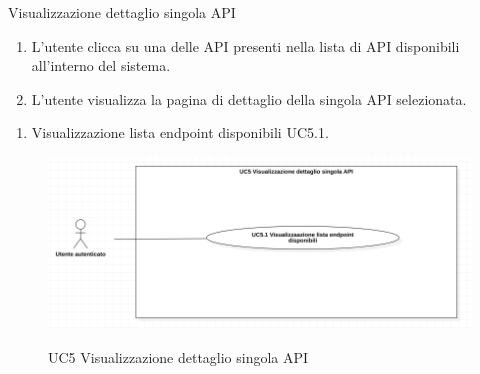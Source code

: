 \begin{usecase}{5}{Visualizzazione dettaglio singola API}\label{uc:visualizzazione-dettaglio-singola-api}

    \usecasemain{}
        \begin{enumerate}
            \item L'utente clicca su una delle API presenti nella lista di API disponibili all'interno del sistema.
            \item L'utente visualizza la pagina di dettaglio della singola API selezionata.
        \end{enumerate}

    \usecasegen{}
        \begin{enumerate}
            \item Visualizzazione lista endpoint disponibili UC5.1.
        \end{enumerate}

\end{usecase}

\begin{figure}[!ht] 
    \centering 
    \includegraphics[width=0.9\columnwidth, alt={Caso d'uso relativo alla visualizzazione del dettaglio di una singola API}]{images/usecase/UC5.jpg}
    \caption{UC5 Visualizzazione dettaglio singola API}\label{fig:uc:visualizzazione-dettaglio-singola-api}
  \end{figure}


